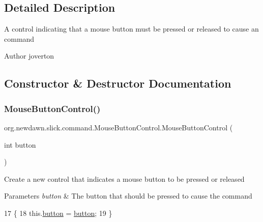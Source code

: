 \subsection{Detailed Description}
A control indicating that a mouse button must be pressed or released to cause an command

\begin{DoxyAuthor}{Author}
joverton 
\end{DoxyAuthor}


\subsection{Constructor \& Destructor Documentation}
\mbox{\label{classorg_1_1newdawn_1_1slick_1_1command_1_1_mouse_button_control_a47ab20a1f4c08a5fc9201c2e14511fe2}} 
\subsubsection{\texorpdfstring{Mouse\+Button\+Control()}{MouseButtonControl()}}
{\footnotesize\ttfamily org.\+newdawn.\+slick.\+command.\+Mouse\+Button\+Control.\+Mouse\+Button\+Control (\begin{DoxyParamCaption}\item[{int}]{button }\end{DoxyParamCaption})\hspace{0.3cm}{\ttfamily [inline]}}

Create a new control that indicates a mouse button to be pressed or released


\begin{DoxyParams}{Parameters}
{\em button} & The button that should be pressed to cause the command \\
\hline
\end{DoxyParams}

\begin{DoxyCode}
17                                           \{
18         this.\mbox{\hyperlink{classorg_1_1newdawn_1_1slick_1_1command_1_1_mouse_button_control_acb6114b65f6e0fd07d4d820d6bd2c04c}{button}} = \mbox{\hyperlink{classorg_1_1newdawn_1_1slick_1_1command_1_1_mouse_button_control_acb6114b65f6e0fd07d4d820d6bd2c04c}{button}};
19     \}
\end{DoxyCode}


